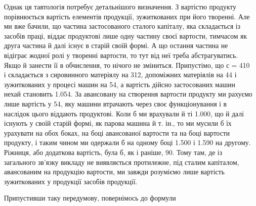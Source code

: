 Однак ця тавтологія потребує детальнішого визначення. З вартістю продукту порівнюється вартість
елементів продукції, зужиткованих при його творенні. Але ми вже бачили, що частина застосованого
сталого капіталу, яка складається із засобів праці, віддає продуктові лише одну частину своєї
вартости, тимчасом як друга частина й далі існує в старій своїй формі. А що остання частина не
відіграє жодної ролі у творенні вартости, то тут від неї треба абстрагуватись. Якщо й занести її в
обчислення, то нічого не зміниться. Припустімо, що с = 410 і
складається з сировинного матеріялу на 312, допоміжних матеріялів на 44 і зужиткованих
у процесі машин на 54, а вартість дійсно застосованих машин нехай становить \num{1.054}. За авансовану на створення вартости продукту ми рахуємо лише вартість у 54, яку машини втрачають через своє функціонування і в наслідок цього віддають продуктові.
Коли б ми врахували
й ті \num{1.000}, що й далі існують у своїй старій формі, як парова машина й т. ін., то
ми мусили б їх урахувати
на обох боках, на боці авансованої вартости та на боці вартости продукту, і таким чином ми
одержали б на одному боці
\num{1.500} і \num{1.590} на другому. Ріжниця, або додаткова вартість, була
б, як і раніше, 90. Тому там, де із загального зв’язку викладу не виявляється
протилежне, під сталим капіталом, авансованим на продукцію
вартости, ми завжди розуміємо лише вартість зужиткованих
у продукції засобів продукції.

Припустивши таку передумову, повернімось до формули

